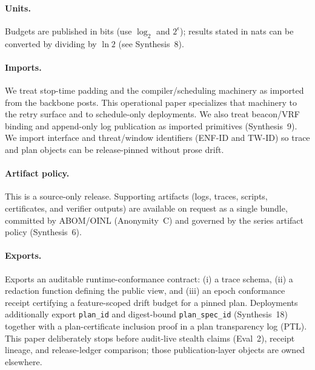\documentclass[11pt]{article}
\begin{document}
\paragraph{Units.} Budgets are published in bits (use $\log_2$ and $2^{\epsilon}$); results stated in nats can be converted by dividing by $\ln 2$ (see Synthesis~8).\cite{series:notation}

\paragraph{Imports.}
We treat stop-time padding and the compiler/scheduling machinery as imported from the backbone posts.\cite{series:schedcompiler,series:stoptimeaddendum}
This operational paper specializes that machinery to the retry surface and to schedule-only deployments.
We also treat beacon/VRF binding and append-only log publication as imported primitives (Synthesis~9).\cite{series:transparencyprimitives}
We import interface and threat/window identifiers (ENF-ID and TW-ID) so trace and plan objects can be release-pinned without prose drift.\cite{series:traceifaces,series:threatwindows}

\paragraph{Artifact policy.}
This is a source-only release. Supporting artifacts (logs, traces, scripts, certificates, and verifier outputs) are available on request as a single bundle, committed by ABOM/OINL (Anonymity~C) and governed by the series artifact policy (Synthesis~6).\cite{series:artifactpolicy}

\paragraph{Exports.}
Exports an auditable runtime-conformance contract: (i) a trace schema, (ii) a redaction function defining the public view, and (iii) an epoch conformance receipt certifying a feature-scoped drift budget for a pinned plan.
Deployments additionally export \texttt{plan\_id} and digest-bound \texttt{plan\_spec\_id} (Synthesis~18) together with a plan-certificate inclusion proof in a plan transparency log (PTL).\cite{series:planstateequiv}
This paper deliberately stops before audit-live stealth claims (Eval~2), receipt lineage, and release-ledger comparison; those publication-layer objects are owned elsewhere.
\end{document}
